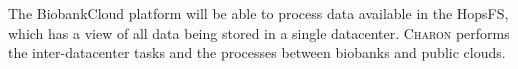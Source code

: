 The BiobankCloud platform will be able to process data available in the HopsFS, which has a view of all data being stored in a single datacenter.
\textsc{Charon} performs the inter-datacenter tasks and the processes between biobanks and public clouds.
